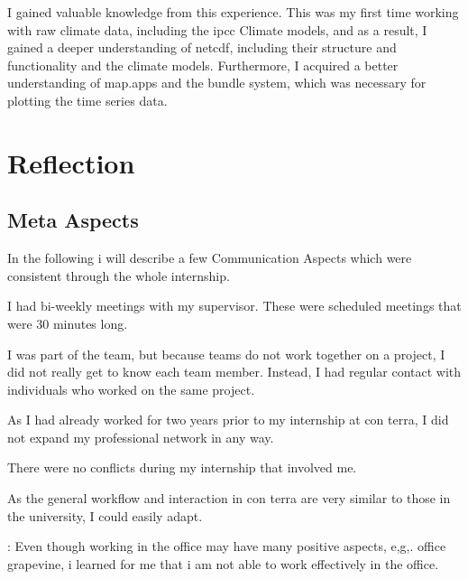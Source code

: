 \documentclass[11pt, titlepage, a4paper]{article}
\begin{document}
I gained valuable knowledge from this experience. This was my first time working with raw climate data, including the \gls{ipcc} Climate models, and as a result, I gained a deeper understanding of \gls{netcdf}, including their structure and functionality and the climate models. Furthermore, I acquired a better understanding of map.apps and the bundle system, which was necessary for plotting the time series data.
\section{Reflection}

\subsection{Meta Aspects}
In the following i will describe a few Communication Aspects which were consistent through the whole internship.
\begin{description}[]
    \item[Supervisor Communication:] I had bi-weekly meetings with my supervisor. These were scheduled meetings that were 30 minutes long.
    \item[Teamwork:] I was part of the team, but because teams do not work together on a project, I did not really get to know each team member. Instead, I had regular contact with individuals who worked on the same project.
    \item[Professional Network:] As I had already worked for two years prior to my internship at con terra, I did not expand my professional network in any way.
    \item[Conflicts:] There were no conflicts during my internship that involved me.
    \item[Applied Communication Skills:]  As the general workflow and interaction in con terra are very similar to those in the university, I could easily adapt.
    \item[In-Office Work]: Even though working in the office may have many positive aspects, e,g,. office grapevine, i learned for me that i am not able to work effectively in the office.  
\end{description}
\end{document}
